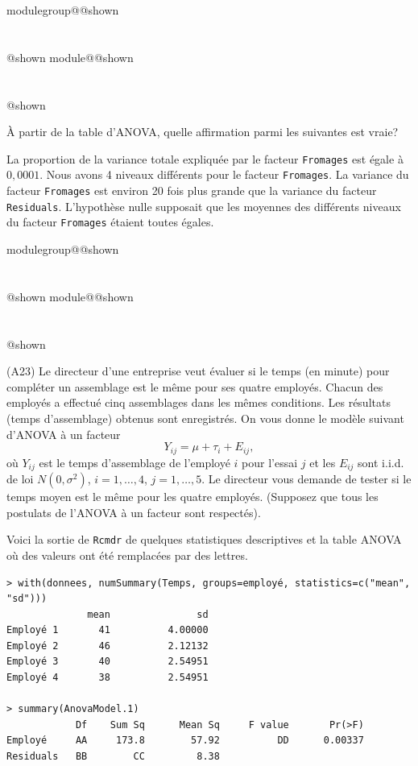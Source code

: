 \documentclass{Evaluation}
\makeatletter
\newcommand{\currentmodulekey}{}
\newcommand{\currentmoduletitle}{}
\newcommand{\currentgroupkey}{}
\newcommand{\currentgrouptitle}{}
\newcommand{\showmoduleifneeded}{%
  \ifx\currentgroupkey\empty\else
    \expandafter\ifx\csname modulegroup@\currentgroupkey @shown\endcsname\relax
      \section*{\currentgrouptitle}%
      \expandafter\gdef\csname modulegroup@\currentgroupkey @shown\endcsname{1}%
    \fi
  \fi
  \expandafter\ifx\csname module@\currentmodulekey @shown\endcsname\relax
    \section*{\currentmoduletitle}%
    \expandafter\gdef\csname module@\currentmodulekey @shown\endcsname{1}%
  \fi
}
\newenvironment{H23}{\showmoduleifneeded}{}
\newenvironment{A23}{\showmoduleifneeded}{}
\makeatother
\begin{document}
\begin{questions}
\begin{H23}
À partir de la table d'ANOVA, quelle affirmation parmi les suivantes est vraie?

\begin{checkboxes}
\choice La proportion de la variance totale expliquée par le facteur \texttt{Fromages} est égale à $0,0001$. 
\choice Nous avons 4 niveaux différents pour le facteur \texttt{Fromages}.
\choice La variance du facteur \texttt{Fromages} est environ 20 fois plus grande que la variance du facteur \texttt{Residuals}.
\correctchoice L'hypothèse nulle supposait que les moyennes des différents niveaux du facteur \texttt{Fromages} étaient toutes égales.
\end{checkboxes}

\vspace{1cm}
\end{H23}

\begin{A23}
\question
(A23) 
Le directeur d'une entreprise veut évaluer si le temps (en minute) pour compléter un assemblage est le même pour ses quatre employés. Chacun des employés a effectué cinq assemblages dans les mêmes conditions. Les résultats (temps d'assemblage) obtenus sont enregistrés. 
On vous donne le modèle suivant d'ANOVA à un facteur
$$Y_{ij}=\mu+\tau_i+E_{ij},$$
où $Y_{ij}$ est le temps d'assemblage de l'employé $i$ pour l'essai $j$ et
les $E_{ij}$ sont i.i.d. de loi $N(0,\sigma^2)$, $i=1,\hdots, 4$,
$j=1,\ldots,5$. 
Le directeur vous demande de tester si le temps moyen est le même pour les quatre employés.
(Supposez que tous les postulats de l'ANOVA à un facteur sont respectés).\medskip

Voici la sortie de \texttt{Rcmdr} de quelques statistiques descriptives et la table ANOVA où des valeurs ont été remplacées par des lettres.

\begin{verbatim} 
> with(donnees, numSummary(Temps, groups=employé, statistics=c("mean", "sd")))
              mean               sd
Employé 1       41          4.00000
Employé 2       46          2.12132
Employé 3       40          2.54951
Employé 4       38          2.54951

> summary(AnovaModel.1)
            Df    Sum Sq      Mean Sq     F value       Pr(>F)
Employé     AA     173.8        57.92          DD      0.00337
Residuals   BB        CC         8.38
\end{verbatim}


\end{A23}
\end{questions}
\end{document}
